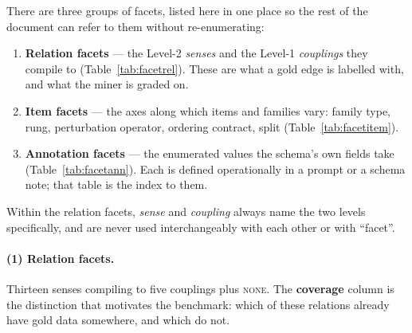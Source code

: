 \documentclass[11pt]{article}
\newcommand{\cNone}{\textsc{none}}
\begin{document}
There are three groups of facets, listed here in one place so the rest of the document can
refer to them without re-enumerating:

\begin{enumerate}[leftmargin=*,nosep,label=(\arabic*)]
  \item \textbf{Relation facets} --- the Level-2 \emph{senses} and the Level-1
        \emph{couplings} they compile to (Table~\ref{tab:facetrel}). These are what a gold edge is
        labelled with, and what the miner is graded on.
  \item \textbf{Item facets} --- the axes along which items and families vary:
        family type, rung, perturbation operator, ordering contract, split
        (Table~\ref{tab:facetitem}).
  \item \textbf{Annotation facets} --- the enumerated values the schema's own fields take
        (Table~\ref{tab:facetann}). Each is defined operationally in a prompt or a schema note;
        that table is the index to them.
\end{enumerate}

\noindent Within the relation facets, \emph{sense} and \emph{coupling} always name the two
levels specifically, and are never used interchangeably with each other or with ``facet''.

\paragraph{(1) Relation facets.}
Thirteen senses compiling to five couplings plus \cNone. The \textbf{coverage} column is the
distinction that motivates the benchmark: which of these relations already have gold data
somewhere, and which do not.
\end{document}
